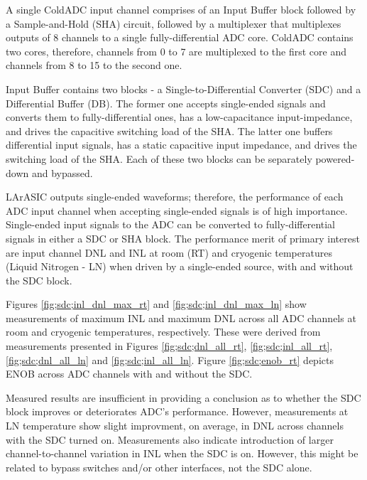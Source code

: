 \label{sec:5.5}


A single ColdADC input channel comprises of an Input Buffer block followed by a Sample-and-Hold (SHA) circuit, followed by a multiplexer that multiplexes outputs of 8 channels to a single fully-differential ADC core. ColdADC contains two cores, therefore, channels from 0 to 7 are multiplexed to the first core and channels from 8 to 15 to the second one.

Input Buffer contains two blocks - a Single-to-Differential Converter (SDC) and a Differential Buffer (DB). The former one accepts single-ended signals and converts them to fully-differential ones, has a low-capacitance input-impedance, and drives the capacitive switching load of the SHA. The latter one buffers differential input signals, has a static capacitive input impedance, and drives the switching load of the SHA. Each of these two blocks can be separately powered-down and bypassed.

LArASIC outputs single-ended waveforms; therefore, the performance of each ADC input channel when accepting single-ended signals is of high importance. Single-ended input signals to the ADC can be converted to fully-differential signals in either a SDC or SHA block. The performance merit of primary interest are input channel DNL and INL at room (RT) and cryogenic temperatures (Liquid Nitrogen - LN) when driven by a single-ended source, with and without the SDC block.

Figures \ref{fig;sdc;inl_dnl_max_rt} and \ref{fig;sdc;inl_dnl_max_ln} show measurements of maximum INL and maximum DNL across all ADC channels at room and cryogenic temperatures, respectively. These were derived from measurements presented in Figures \ref{fig;sdc;dnl_all_rt}, \ref{fig;sdc;inl_all_rt}, \ref{fig;sdc;dnl_all_ln} and \ref{fig;sdc;inl_all_ln}. Figure \ref{fig;sdc;enob_rt} depicts ENOB across ADC channels with and without the SDC.

Measured results are insufficient in providing a conclusion as to whether the SDC block improves or deteriorates ADC's performance. However, measurements at LN temperature show slight improvment, on average, in DNL across channels with the SDC turned on. Measurements also indicate introduction of larger channel-to-channel variation in INL when the SDC is on. However, this might be related to bypass switches and/or other interfaces, not the SDC alone.

